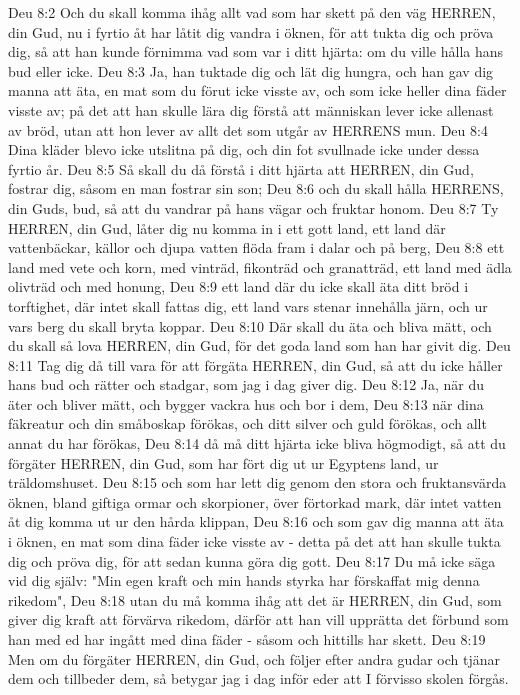Deu 8:2  Och du skall komma ihåg allt vad som har skett på den väg HERREN, din Gud, nu i fyrtio åt har låtit dig vandra i öknen, för att tukta dig och pröva dig, så att han kunde förnimma vad som var i ditt hjärta: om du ville hålla hans bud eller icke.
Deu 8:3  Ja, han tuktade dig och lät dig hungra, och han gav dig manna att äta, en mat som du förut icke visste av, och som icke heller dina fäder visste av; på det att han skulle lära dig förstå att människan lever icke allenast av bröd, utan att hon lever av allt det som utgår av HERRENS mun.
Deu 8:4  Dina kläder blevo icke utslitna på dig, och din fot svullnade icke under dessa fyrtio år.
Deu 8:5  Så skall du då förstå i ditt hjärta att HERREN, din Gud, fostrar dig, såsom en man fostrar sin son;
Deu 8:6  och du skall hålla HERRENS, din Guds, bud, så att du vandrar på hans vägar och fruktar honom.
Deu 8:7  Ty HERREN, din Gud, låter dig nu komma in i ett gott land, ett land där vattenbäckar, källor och djupa vatten flöda fram i dalar och på berg,
Deu 8:8  ett land med vete och korn, med vinträd, fikonträd och granatträd, ett land med ädla olivträd och med honung,
Deu 8:9  ett land där du icke skall äta ditt bröd i torftighet, där intet skall fattas dig, ett land vars stenar innehålla järn, och ur vars berg du skall bryta koppar.
Deu 8:10  Där skall du äta och bliva mätt, och du skall så lova HERREN, din Gud, för det goda land som han har givit dig.
Deu 8:11  Tag dig då till vara för att förgäta HERREN, din Gud, så att du icke håller hans bud och rätter och stadgar, som jag i dag giver dig.
Deu 8:12  Ja, när du äter och bliver mätt, och bygger vackra hus och bor i dem,
Deu 8:13  när dina fäkreatur och din småboskap förökas, och ditt silver och guld förökas, och allt annat du har förökas,
Deu 8:14  då må ditt hjärta icke bliva högmodigt, så att du förgäter HERREN, din Gud, som har fört dig ut ur Egyptens land, ur träldomshuset.
Deu 8:15  och som har lett dig genom den stora och fruktansvärda öknen, bland giftiga ormar och skorpioner, över förtorkad mark, där intet vatten åt dig komma ut ur den hårda klippan,
Deu 8:16  och som gav dig manna att äta i öknen, en mat som dina fäder icke visste av - detta på det att han skulle tukta dig och pröva dig, för att sedan kunna göra dig gott.
Deu 8:17  Du må icke säga vid dig själv: "Min egen kraft och min hands styrka har förskaffat mig denna rikedom",
Deu 8:18  utan du må komma ihåg att det är HERREN, din Gud, som giver dig kraft att förvärva rikedom, därför att han vill upprätta det förbund som han med ed har ingått med dina fäder - såsom och hittills har skett.
Deu 8:19  Men om du förgäter HERREN, din Gud, och följer efter andra gudar och tjänar dem och tillbeder dem, så betygar jag i dag inför eder att I förvisso skolen förgås.
